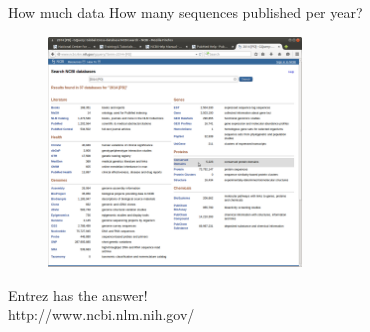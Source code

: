 \documentclass[pdf]{beamer}
\begin{document}
\begin{frame}{How much data}
  How many sequences published per year?
  \begin{figure}[ht]
    \includegraphics[width=0.6\textwidth]{images/NCBI_search_2014}
  \end{figure}
  Entrez has the answer!\\
  http://www.ncbi.nlm.nih.gov/
\end{frame}
\end{document}
